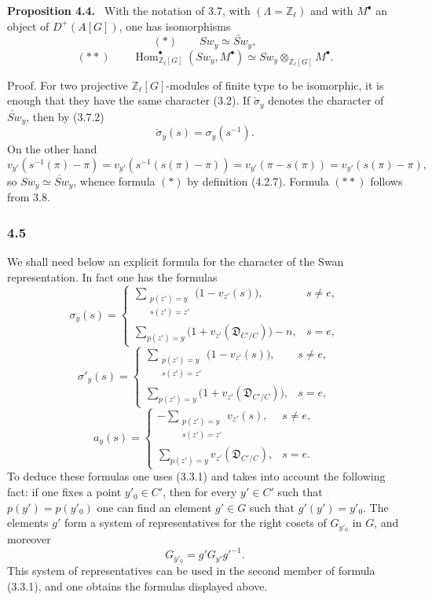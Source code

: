\documentclass[11pt]{article}
\newenvironment{statement}[1]{\par\medskip\noindent\textbf{#1.}\ }{\par\medskip}
\DeclareMathOperator{\Hom}{Hom}
\providecommand{\Hom}{\operatorname{Hom}}
\providecommand{\Hom}{\operatorname{Hom}}
\begin{document}
\begin{statement}{Proposition 4.4}
With the notation of 3.7, with $(\Lambda=\mathbb Z_\ell)$ and with $M^\bullet$ an object of $D^+(A[G])$, one has isomorphisms
\[
(*)\qquad Sw_y\simeq \check{Sw}_y,
\]
\[
(**)\qquad
\Hom^\bullet_{\mathbb Z_\ell[G]}(Sw_y,M^\bullet)
\simeq Sw_y\otimes_{\mathbb Z_\ell[G]}M^\bullet.
\]
\end{statement}

Proof. For two projective $\mathbb Z_\ell[G]$-modules of finite type to be isomorphic, it is enough that they have the same character (3.2). If $\check\sigma_y$ denotes the character of $\check{Sw}_y$, then by (3.7.2)
\[
\check\sigma_y(s)=\sigma_y(s^{-1}).
\]
On the other hand
\[
v_{y'}(s^{-1}(\pi)-\pi)
=v_{y'}(s^{-1}(s(\pi)-\pi))
=v_{y'}(\pi-s(\pi))
=v_{y'}(s(\pi)-\pi),
\]
so $Sw_y\simeq\check{Sw}_y$, whence formula $(*)$ by definition (4.2.7). Formula $(**)$ follows from 3.8.

\subsubsection*{4.5}

We shall need below an explicit formula for the character of the Swan representation. In fact one has the formulas
\[
\sigma_y(s)=
\begin{cases}
\displaystyle\sum_{\substack{p(z')=y\\s(z')=z'}}\bigl(1-v_{z'}(s)\bigr),& s\ne e,\\[0.8em]
\displaystyle\sum_{p(z')=y}\bigl(1+v_{z'}(\mathfrak D_{C'/C})\bigr)-n,& s=e,
\end{cases}
\tag{4.5.1}
\]
\[
\sigma'_y(s)=
\begin{cases}
\displaystyle\sum_{\substack{p(z')=y\\s(z')=z'}}\bigl(1-v_{z'}(s)\bigr),& s\ne e,\\[0.8em]
\displaystyle\sum_{p(z')=y}\bigl(1+v_{z'}(\mathfrak D_{C'/C})\bigr),& s=e,
\end{cases}
\tag{4.5.2}
\]
\[
a_y(s)=
\begin{cases}
\displaystyle-\sum_{\substack{p(z')=y\\s(z')=z'}}v_{z'}(s),& s\ne e,\\[0.8em]
\displaystyle\sum_{p(z')=y}v_{z'}(\mathfrak D_{C'/C}),& s=e.
\end{cases}
\tag{4.5.3}
\]
To deduce these formulas one uses (3.3.1) and takes into account the following fact: if one fixes a point $y'_0\in C'$, then for every $y'\in C'$ such that $p(y')=p(y'_0)$ one can find an element $g'\in G$ such that $g'(y')=y'_0$. The elements $g'$ form a system of representatives for the right cosets of $G_{y'_0}$ in $G$, and moreover
\[
G_{y'_0}=g'G_{y'}g'^{-1}.
\]
This system of representatives can be used in the second member of formula (3.3.1), and one obtains the formulas displayed above.
\end{document}

